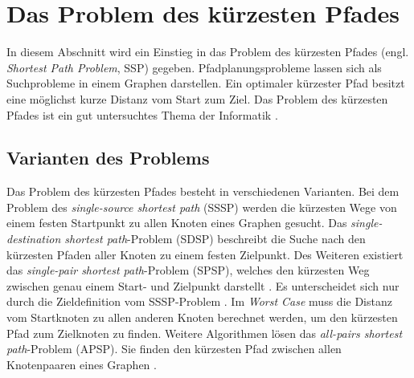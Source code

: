 \chapter{Das Problem des kürzesten Pfades}
\label{spp}
In diesem Abschnitt wird ein Einstieg in das Problem des kürzesten Pfades (engl. \textit{Shortest Path Problem}, SSP) gegeben. Pfadplanungsprobleme lassen sich als Suchprobleme in einem Graphen darstellen. Ein optimaler kürzester Pfad besitzt eine möglichst kurze Distanz vom Start zum Ziel. Das Problem des kürzesten Pfades ist ein gut untersuchtes Thema der Informatik \cite[S.1]{Madkour.2017}.


\section{Varianten des Problems}

Das Problem des kürzesten Pfades besteht in verschiedenen Varianten. Bei dem Problem des \textit{single-source shortest path} (SSSP) werden die kürzesten Wege von einem festen Startpunkt zu allen Knoten eines Graphen gesucht. Das \textit{single-destination shortest path}-Problem (SDSP)  beschreibt die Suche nach den kürzesten Pfaden aller Knoten zu einem festen Zielpunkt. Des Weiteren existiert das \textit{single-pair shortest path}-Problem (SPSP), welches den kürzesten Weg zwischen genau einem Start- und Zielpunkt darstellt \cite[S.644]{Cormen.2009}. Es unterscheidet sich nur durch die Zieldefinition vom SSSP-Problem \cite{Ottmann.2017}. Im \textit{Worst Case} muss die Distanz vom Startknoten zu allen anderen Knoten berechnet werden, um den kürzesten Pfad zum Zielknoten zu finden. Weitere Algorithmen lösen das \textit{all-pairs shortest path}-Problem (APSP). Sie finden den kürzesten Pfad zwischen allen Knotenpaaren eines Graphen \cite{Guting.2018}.



